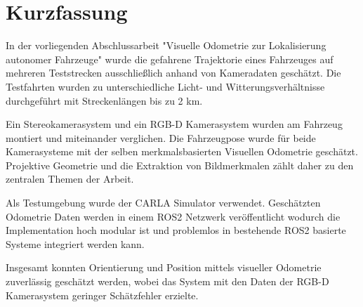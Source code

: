 

\section*{Kurzfassung}
In der vorliegenden Abschlussarbeit "Visuelle Odometrie zur Lokalisierung autonomer Fahrzeuge" wurde die gefahrene Trajektorie eines Fahrzeuges auf mehreren Teststrecken ausschlie{\ss}lich anhand von Kameradaten geschätzt. Die Testfahrten wurden zu unterschiedliche Licht- und Witterungsverhältnisse durchgeführt mit Streckenlängen bis zu 2 km. 
\newline

Ein Stereokamerasystem und ein RGB-D Kamerasystem wurden am Fahrzeug montiert und miteinander verglichen. Die Fahrzeugpose wurde für beide Kamerasysteme mit der selben merkmalsbasierten Visuellen Odometrie geschätzt. Projektive Geometrie und die Extraktion von Bildmerkmalen zählt daher zu den zentralen Themen der Arbeit. 
\newline

Als Testumgebung wurde der CARLA Simulator verwendet. Geschätzten Odometrie Daten werden in einem ROS2 Netzwerk veröffentlicht wodurch die Implementation hoch modular ist und problemlos in bestehende ROS2 basierte Systeme integriert werden kann. 
\newline

Insgesamt konnten Orientierung und Position mittels visueller Odometrie zuverlässig geschätzt werden, wobei das System mit den Daten der RGB-D Kamerasystem geringer Schätzfehler erzielte.  


